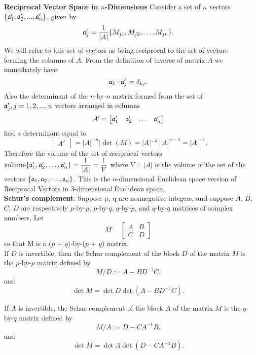 {\bf Reciprocal Vector Space in $n$-Dimensions}
Consider a set of $n$ vectors $\{ \mathfrak{a}'_1, \mathfrak{a}'_2, ...,\mathfrak{a}'_n\}$, given by
\[ \mathfrak{a}'_j = {1\over|A|}\{M_{j1},M_{j2},\hdots,M_{jn}\}.\] We will refer to this set of vectors as being reciprocal to the set of vectors forming the columns of $A$. 
From the definition of inverse of matrix $A$ we immediately have
\[ \mathfrak{a}_k \cdot \mathfrak{a}'_j = \delta_{kj}.\] 
Also the determinant of the $n$-by-$n$ matrix formed from the set of $\mathfrak{a}'_j, j=1,2,...,n$ vectors arranged in columns
\begin{equation}
A' = 
\begin{bmatrix}
\mathfrak{a}'_{1} & \mathfrak{a}'_{2}  & \hdots & \mathfrak{a}'_{n}  \\
\end{bmatrix}
\end{equation}had a determinant equal to 
\begin{equation}
\begin{vmatrix} 
A'
\end{vmatrix} = |A|^{-n}| \det(M) =  |A|^{-n}| |A|^{n-1} = |A|^{-1}.
\end{equation}Therefore the volume of the set of reciprocal vectors ${\rm volume}\{\mathfrak{a}'_1, \mathfrak{a}'_2, \hdots, \mathfrak{a}'_n\} = \displaystyle{{1\over|A|} = {1\over V}}$ where $V =|A|$ is the volume of the set of the vectors
$\{\mathfrak{a}_1, \mathfrak{a}_2, \hdots, \mathfrak{a}_n\}$. This is the $n$-dimensional Euclidean space version of Reciprocal Vectors in 3-dimensional Euclidean space.\\

{\bf Schur's complement}:
Suppose p, q are nonnegative integers, and suppose $A$, $B$, $C$, $D$ are respectively $p$-by-$p$, $p$-by-$q$, $q$-by-$p$, and $q$-by-$q$ matrices of complex numbers. Let
\begin{equation}
{\displaystyle M=\left[{\begin{matrix}A&B\\C&D\end{matrix}}\right]}
\end{equation} so that M is a ($p$ + $q$)-by-($p$ + $q$) matrix.\\

If $D$ is invertible, then the Schur complement of the block $D$ of the matrix $M$ is the $p$-by-$p$ matrix defined by
\begin{equation}
{\displaystyle M/D:=A - BD^{-1}C.}\label{M/D}
\end{equation}
and $$\det M = \det D \det (A - BD^{-1}C).$$

If $A$ is invertible, the Schur complement of the block $A$ of the matrix $M$ is the $q$-by-$q$ matrix defined by
\begin{equation}
{\displaystyle M/A:=D - CA^{-1}B.}\label{M/A}
\end{equation}
and $$\det M = \det A \det (D - CA^{-1}B).$$

